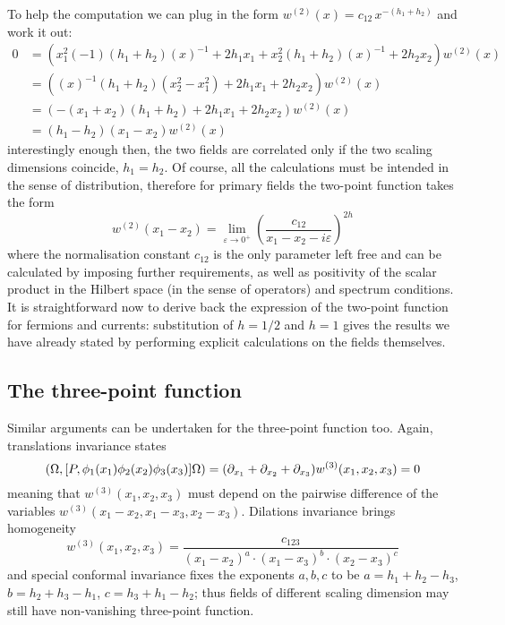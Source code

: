 To help the computation we can plug in the form
${w^{(2)}(x)}=c_{12}\,x^{-(h_1+h_2)}$
and work it out:
\begin{align*}
0&=\left(x_1^2 (-1)(h_1+h_2)(x)^{-1} + 2h_1 x_1+\right.
\left. x_2^2 (h_1+h_2)(x)^{-1} + 2h_2 x_2\right){w^{(2)}(x)}\\
&=\left((x)^{-1}(h_1+h_2)(x_2^2-x_1^2) + 2h_1 x_1 + 2h_2 x_2\right)
{w^{(2)}(x)}\\
&=\left(-(x_1+x_2)(h_1+h_2) + 2h_1 x_1 + 2h_2 x_2\right){w^{(2)}(x)}\\
&=(h_1-h_2)(x_1-x_2){w^{(2)}(x)}
\end{align*}
interestingly enough then, the two fields are correlated only
if the two scaling dimensions coincide, $h_1=h_2$. Of course,
all the calculations must be intended in the sense of distribution,
therefore for primary fields the two-point function takes the form 
\[
w^{(2)}(x_1-x_2)=\lim_{\varepsilon\to 0^+} 
\left(\frac{c_{12}}{x_1-x_2-i\varepsilon}\right)^{2h}
\]
where the normalisation constant $c_{12}$ is the only parameter left free and
can be calculated by imposing further requirements, as well
as positivity of the scalar product in the Hilbert space
(in the sense of operators) and spectrum conditions. It is
straightforward now to derive back the expression of the
two-point function for fermions and currents: substitution
of $h=1/2$ and $h=1$ gives the results we have already 
stated by performing explicit calculations on the fields 
themselves.

\subsection{The three-point function}
Similar arguments can be undertaken for the three-point
function too. Again, translations invariance states
\[
(\Omega,[P,\phi_1(x_1)\phi_2(x_2)\phi_3(x_3)]\Omega)
=(\partial_{x_1}+\partial_{x_2}+\partial_{x_3})w^{(3)}(x_1,x_2,x_3)=0
\]
meaning that $w^{(3)}(x_1,x_2,x_3)$ must depend on the pairwise
difference of the variables $w^{(3)}(x_1-x_2,x_1-x_3,x_2-x_3)$.
Dilations invariance brings homogeneity
\[
w^{(3)}(x_1,x_2,x_3)=\frac{c_{123}}{(x_1-x_2)^a\cdot(x_1-x_3)^b
\cdot(x_2-x_3)^c}
\]
and special conformal invariance fixes the exponents $a,b,c$
to be $a=h_1+h_2-h_3$, $b=h_2+h_3-h_1$, $c=h_3+h_1-h_2$; thus
fields of different scaling dimension may still have 
non-vanishing three-point function.

